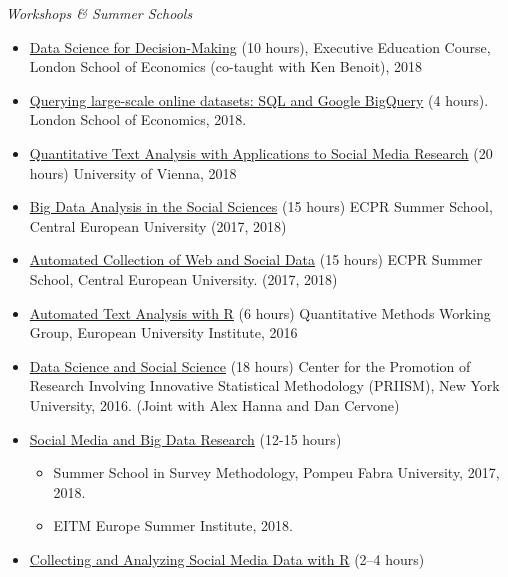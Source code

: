 \documentclass[margin,line,11pt]{resume}
\begin{document}
\begin{resume}
\emph{Workshops \& Summer Schools}
\begin{itemize}
\item \href{https://www.lse.ac.uk/study-at-lse/executive-education/courses/secure/business-and-management/data-science-for-decision-making}{Data Science for Decision-Making} (10 hours), Executive Education Course, London School of Economics (co-taught with Ken Benoit), 2018
\item \href{http://pablobarbera.com/SQL-workshop/}{Querying large-scale online datasets: SQL and Google BigQuery} (4 hours). London School of Economics, 2018.
\item \href{http://pablobarbera.com/text-analysis-vienna/}{Quantitative Text Analysis with Applications to Social Media Research} (20 hours) University of Vienna, 2018
\item \href{https://ecpr.eu/Events/PanelDetails.aspx?PanelID=7061&EventID=116}{Big Data Analysis in the Social Sciences} (15 hours) ECPR Summer School, Central European University (2017, 2018)
\item \href{https://ecpr.eu/Events/PanelDetails.aspx?PanelID=7055&EventID=116}{Automated Collection of Web and Social Data} (15 hours) ECPR Summer School, Central European University. (2017, 2018)
\item \href{https://github.com/pablobarbera/eui-text-workshop}{Automated Text Analysis with R} (6 hours) Quantitative Methods Working Group, European University Institute, 2016
\item \href{https://github.com/pablobarbera/data-science-workshop}{Data Science and Social Science} (18 hours) Center for the Promotion of Research Involving Innovative Statistical Methodology (PRIISM), New York University, 2016. (Joint with Alex Hanna and Dan Cervone)
\newpage
\item \href{http://pablobarbera.com/eitm}{Social Media and Big Data Research} (12-15 hours)
\begin{itemize}
\vspace{-.1cm}
\item Summer School in Survey Methodology, Pompeu Fabra University, 2017, 2018.
\vspace{-.1cm}
\item EITM Europe Summer Institute, 2018.
\end{itemize}
\item \href{http://pablobarbera.com/social-media-workshop/}{Collecting and Analyzing Social Media Data with R} (2--4 hours)
\begin{itemize}
\vspace{-.1cm}

\end{itemize}
\end{itemize}
\end{resume}
\end{document}
